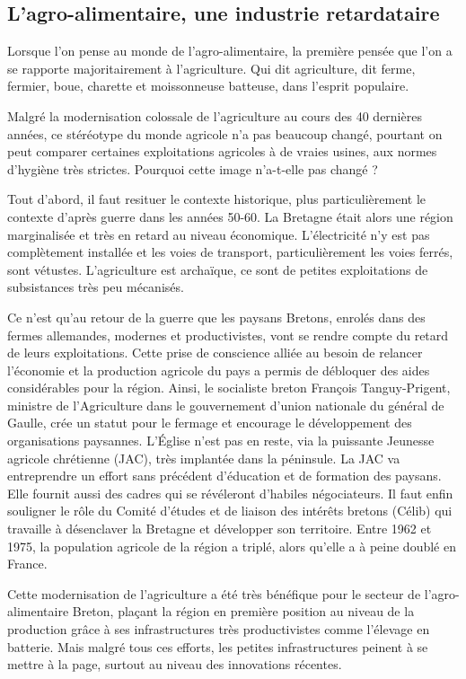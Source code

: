 \documentclass[a4paper,12pt]{report}
\begin{document}
		\subsection{L'agro-alimentaire, une industrie retardataire}
			Lorsque l’on pense au monde de l’agro-alimentaire, la première pensée que l’on a se rapporte majoritairement à l’agriculture. Qui dit agriculture, dit ferme, fermier, boue, charette et moissonneuse batteuse, dans l’esprit populaire.
			
			Malgré la modernisation colossale de l’agriculture au cours des 40 dernières années, ce stéréotype du monde agricole n’a pas beaucoup changé, pourtant on peut comparer certaines exploitations agricoles à de vraies usines, aux normes d’hygiène très strictes. Pourquoi cette image n’a-t-elle pas changé ?
			
			Tout d’abord, il faut resituer le contexte historique, plus particulièrement le contexte d’après guerre dans les années 50-60. La Bretagne était alors une région marginalisée et très en retard au niveau économique. L’électricité n’y est pas complètement installée et les voies de transport, particulièrement les voies ferrés, sont vétustes. L’agriculture est archaïque, ce sont de petites exploitations de subsistances très peu mécanisés.
			
			Ce n’est qu’au retour de la guerre que les paysans Bretons, enrolés dans des fermes allemandes, modernes et productivistes, vont se rendre compte du retard de leurs exploitations. Cette prise de conscience alliée au besoin de relancer l’économie et la production agricole du pays a permis de débloquer des aides considérables pour la région. Ainsi, le socialiste breton François Tanguy-Prigent, ministre de l'Agriculture dans le gouvernement d'union nationale du général de Gaulle, crée un statut pour le fermage et encourage le développement des organisations paysannes. L'Église n'est pas en reste, via la puissante Jeunesse agricole chrétienne (JAC), très implantée dans la péninsule. La JAC va entreprendre un effort sans précédent d'éducation et de formation des paysans. Elle fournit aussi des cadres qui se révéleront d'habiles négociateurs. Il faut enfin souligner le rôle du Comité d'études et de liaison des intérêts bretons (Célib) qui travaille à désenclaver la Bretagne et développer son territoire\cite{ModernisationAgricultureBretonne}. Entre 1962 et 1975, la population agricole de la région a triplé, alors qu’elle a à peine doublé en France.
			
			Cette modernisation de l’agriculture a été très bénéfique pour le secteur de l’agro-alimentaire Breton, plaçant la région en première position au niveau de la production grâce à ses infrastructures très productivistes comme l’élevage en batterie. Mais malgré tous ces efforts, les petites infrastructures peinent à se mettre à la page, surtout au niveau des innovations récentes. 
			
\end{document}
